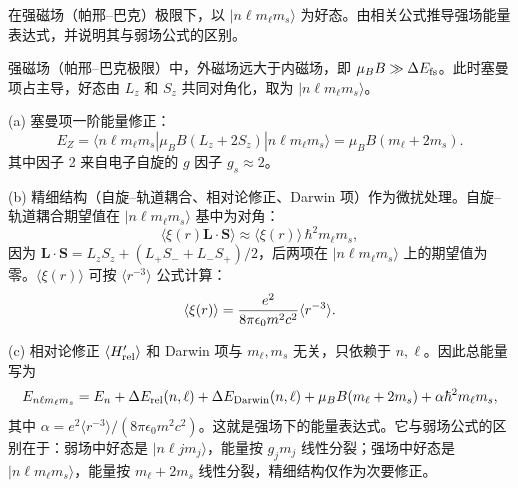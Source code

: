\begin{question}
在强磁场（帕邢--巴克）极限下，以 $|n\ell m_\ell m_s\rangle$ 为好态。由相关公式推导强场能量表达式，并说明其与弱场公式的区别。
\end{question}
\begin{solution}
强磁场（帕邢--巴克极限）中，外磁场远大于内磁场，即 $\mu_B B \gg \Delta E_{\rm fs}$。此时塞曼项占主导，好态由 $L_z$ 和 $S_z$ 共同对角化，取为 $|n\ell m_\ell m_s\rangle$。

(a) 塞曼项一阶能量修正：
\[
E_Z = \langle n\ell m_\ell m_s|\mu_B B(L_z+2S_z)|n\ell m_\ell m_s\rangle
= \mu_B B(m_\ell + 2m_s).
\]
其中因子 2 来自电子自旋的 $g$ 因子 $g_s\approx2$。

(b) 精细结构（自旋--轨道耦合、相对论修正、Darwin 项）作为微扰处理。自旋--轨道耦合期望值在 $|n\ell m_\ell m_s\rangle$ 基中为对角：
\[
\langle \xi(r)\mathbf L\cdot\mathbf S\rangle
\approx \langle \xi(r)\rangle \,\hbar^2 m_\ell m_s,
\]
因为 $\mathbf L\cdot\mathbf S = L_z S_z + (L_+S_-+L_-S_+)/2$，后两项在 $|n\ell m_\ell m_s\rangle$ 上的期望值为零。$\langle\xi(r)\rangle$ 可按 $\langle r^{-3}\rangle$ 公式计算：
\[
\langle \xi(r)\rangle = {e^2\over8\pi\epsilon_0 m^2c^2}\langle r^{-3}\rangle.
\]

(c) 相对论修正 $\langle H_{\rm rel}'\rangle$ 和 Darwin 项与 $m_\ell,m_s$ 无关，只依赖于 $n,\ell$。因此总能量写为
\[
E_{n\ell m_\ell m_s} = E_n + \Delta E_{\rm rel}(n,\ell) + \Delta E_{\rm Darwin}(n,\ell) + \mu_B B(m_\ell+2m_s) + \alpha \hbar^2 m_\ell m_s,
\]
其中 $\alpha = e^2\langle r^{-3}\rangle/(8\pi\epsilon_0 m^2c^2)$。这就是强场下的能量表达式。它与弱场公式的区别在于：弱场中好态是 $|n\ell j m_j\rangle$，能量按 $g_j m_j$ 线性分裂；强场中好态是 $|n\ell m_\ell m_s\rangle$，能量按 $m_\ell+2m_s$ 线性分裂，精细结构仅作为次要修正。
\end{solution}

